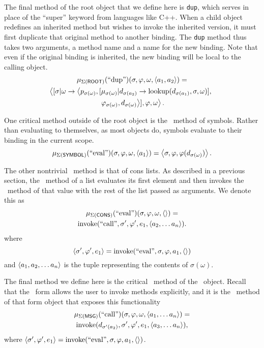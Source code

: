 \documentclass[twocolumn]{article}
\begin{document}
The final method of the root object that we define here is
\texttt{dup}, which serves in place of the ``super'' keyword from
languages like C++. When a child object redefines an inherited method
but wishes to invoke the inherited version, it must first duplicate
that original method to another binding. The \texttt{dup} method thus
takes two arguments, a method name and a name for the new
binding. Note that even if the original binding is inherited, the new
binding will be local to the calling object.
\begin{multline*}
  \mu_{\Sigma(\mathsf{ROOT})}(\text{``dup''})(\sigma,\varphi,\omega,
  \left< a_1,a_2\right>) =\\ \left< [\sigma|\omega\rightarrow \left<
  p_{\sigma(\omega)}, [\mu_{\sigma(\omega)}|d_{\sigma(a_2)}\rightarrow
  \operatorname{lookup}(d_{\sigma(a_1)},\sigma,\omega)],\right.\right.\\\left.\left.
  \varphi_{\sigma(\omega)},
  d_{\sigma(\omega)}\right>],\varphi, \omega\right>.
\end{multline*}

One critical method outside of the root object is the \eval\ method of
symbols. Rather than evaluating to themselves, as most objects do,
symbols evaluate to their binding in the current scope.
\[  \mu_{\Sigma(\mathsf{SYMBOL})}(\text{``eval''})(\sigma,\varphi,\omega,
\left< a_1\right>) = \left< \sigma, \varphi, \varphi(d_{\sigma(\omega)})\right>.\]

The other nontrivial \eval\ method is that of cons lists. As described
in a previous section, the \eval\ method of a list evaluates its first
element and then invokes the \call\ method of that value with the rest
of the list passed as arguments. We denote this as
\begin{multline*}
\mu_{\Sigma(\mathsf{CONS})}(\text{``eval''})(\sigma,\varphi,\omega,
\left<\right>) = \\\operatorname{invoke}(\text{``call''},\sigma',\varphi',e_1,\left< a_2,\ldots
a_n\right>).
\end{multline*}
where 
\[ \left< \sigma',\varphi',e_1\right> =
\operatorname{invoke}(\text{``eval''},\sigma,\varphi,a_1,\left<\right>) \]
and $\left< a_1,a_2,\ldots a_n\right>$ is the tuple representing the
contents of $\sigma(\omega)$.

The final method we define here is the critical \call\ method of the
\msg\ object. Recall that the \msg\ form allows the user to invoke
methods explicitly, and it is the \call\ method of that form object
that exposes this functionality
\begin{multline*}
  \mu_{\Sigma(\mathsf{MSG})}(\text{``call''})(\sigma,\varphi,\omega,
  \left< a_1,\ldots a_n \right>) = \\\operatorname{invoke}( d_{\sigma'(a_2)}, \sigma', \varphi', e_1,
  \left< a_3,\ldots a_n \right>),
\end{multline*}
where $\left< \sigma', \varphi', e_1\right> =
\operatorname{invoke}(\text{``eval''},\sigma,\varphi,a_1,\left<\right>)$.
\end{document}
